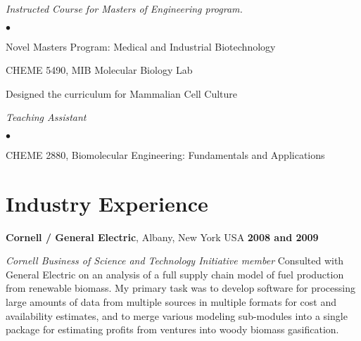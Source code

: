 \documentclass[margin,line]{res}
\newenvironment{list2}{
  \begin{list}{$\bullet$}{%
      \setlength{\itemsep}{0in}
      \setlength{\parsep}{0in} \setlength{\parskip}{0in}
      \setlength{\topsep}{0in} \setlength{\partopsep}{0in} 
      \setlength{\leftmargin}{0.2in}}}{\end{list}}
\begin{document}
\begin{resume}

{\em Instructed Course for Masters of Engineering program.}
\begin{list2}
\item Novel Masters Program: Medical and Industrial Biotechnology
\item CHEME 5490, MIB Molecular Biology Lab
\item Designed the curriculum for Mammalian Cell Culture  
\end{list2}

{\em Teaching Assistant}
\begin{list2}
\item CHEME 2880, Biomolecular Engineering: Fundamentals and Applications\\
\end{list2}


\section{\sc Industry Experience}
{\bf Cornell / General Electric}, Albany, New York USA \hfill {\bf 2008 and 2009}

\vspace{-.35cm}
{\em Cornell Business of Science and Technology Initiative member} 
Consulted with General Electric on an analysis of a full supply chain model of fuel production from 
renewable biomass.  My primary task was to develop software for processing large amounts of data
from multiple sources in multiple formats for cost and availability estimates, 
and to merge various modeling sub-modules 
into a single package for estimating profits from ventures into woody biomass gasification.      
\vspace{-.2cm}


\end{resume}
\end{document}
